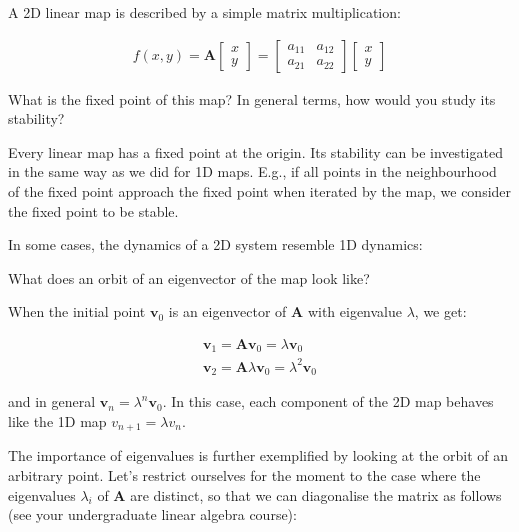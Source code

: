 \pagebreak


A 2D linear map is described by a simple matrix multiplication:

\begin{gather}
f(x,y) = {\mathbf A} 
\begin{bmatrix}
x \\
y
\end{bmatrix}
=
\begin{bmatrix}
a_{11} & a_{12} \\
a_{21} & a_{22}
\end{bmatrix}
\begin{bmatrix}
x \\
y
\end{bmatrix}
\end{gather} 

\begin{cue}
What is the fixed point of this map? In general terms, how would you study its stability? 
\end{cue}

Every linear map has a fixed point at the origin. Its stability can be investigated in the same way as we did for 1D maps. E.g., if all points in the neighbourhood of the fixed point approach the fixed point when iterated by the map, we consider the fixed point to be stable.

In some cases, the dynamics of a 2D system resemble 1D dynamics:

\begin{cue}
What does an orbit of an eigenvector of the map look like?  
\end{cue}

When the initial point ${\mathbf v_0}$ is an eigenvector of ${\mathbf A}$ with eigenvalue $\lambda$, we get:

\begin{gather}
{\mathbf v_1} = {\mathbf A}{\mathbf v_0} = \lambda {\mathbf v_0} \\
{\mathbf v_2} = {\mathbf A}\lambda {\mathbf v_0} = \lambda^2 {\mathbf v_0} 
\end{gather} 

and in general ${\mathbf v_n} = \lambda^n {\mathbf v_0}$. In this case, each component of the 2D map behaves like the 1D map $v_{n+1} = \lambda v_n$.

The importance of eigenvalues is further exemplified by looking at the orbit of an arbitrary point. Let's restrict ourselves for the moment to the case where the eigenvalues $\lambda_i$ of ${\mathbf A}$ are distinct, so that we can diagonalise the matrix as follows (see your undergraduate linear algebra course):

